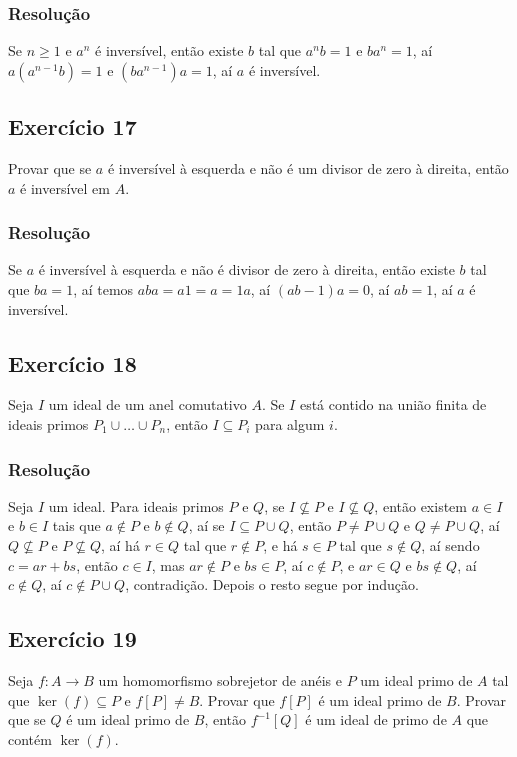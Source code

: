 \documentclass[10pt,a4paper]{article}
\begin{document}
\subsubsection*{Resolução}

Se $n\geq 1$ e $a^n$ é inversível, então existe $b$ tal que $a^nb=1$ e $ba^n=1$, aí $a(a^{n-1}b)=1$ e $(ba^{n-1})a=1$, aí $a$ é inversível.

\subsection*{Exercício 17}
Provar que se $a$ é inversível à esquerda e não é um divisor de zero à direita, então $a$ é inversível em $A$.

\subsubsection*{Resolução}

Se $a$ é inversível à esquerda e não é divisor de zero à direita, então existe $b$ tal que $ba=1$, aí temos $aba=a1=a=1a$, aí $(ab-1)a=0$, aí $ab=1$, aí $a$ é inversível.

\subsection*{Exercício 18}
Seja $I$ um ideal de um anel comutativo $A$. Se $I$ está contido na união finita de ideais primos $P_1\cup\dots\cup P_n$, então $I\subseteq P_i$ para algum $i$.

\subsubsection*{Resolução}

Seja $I$ um ideal. Para ideais primos $P$ e $Q$, se $I\nsubseteq P$ e $I\nsubseteq Q$, então existem $a\in I$ e $b\in I$ tais que $a\notin P$ e $b\notin Q$, aí se $I\subseteq P\cup Q$, então $P\neq P\cup Q$ e $Q\neq P\cup Q$, aí $Q\nsubseteq P$ e $P\nsubseteq Q$, aí há $r\in Q$ tal que $r\notin P$, e há $s\in P$ tal que $s\notin Q$, aí sendo $c=ar+bs$, então $c\in I$, mas $ar\notin P$ e $bs\in P$, aí $c\notin P$, e $ar\in Q$ e $bs\notin Q$, aí $c\notin Q$, aí $c\notin P\cup Q$, contradição. Depois o resto segue por indução.

\subsection*{Exercício 19}
Seja $f:A\rightarrow B$ um homomorfismo sobrejetor de anéis e $P$ um ideal primo de $A$ tal que $\ker(f)\subseteq P$ e $f[P]\neq B$. Provar que $f[P]$ é um ideal primo de $B$. Provar que se $Q$ é um ideal primo de $B$, então $f^{-1}[Q]$ é um ideal de primo de $A$ que contém $\ker(f)$.
\end{document}
